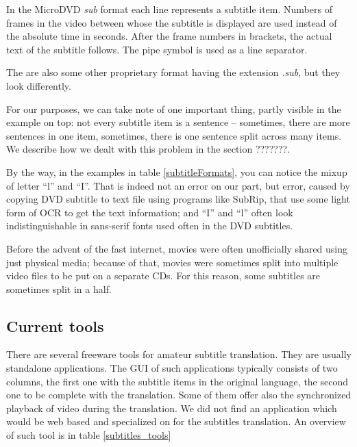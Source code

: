 In the MicroDVD \emph{sub} format each line represents a subtitle item. Numbers of frames in the video between whose the subtitle is displayed are used instead of the absolute time in seconds. After the frame numbers in brackets, the actual text of the subtitle follows. The pipe symbol is used as a line separator. 

The are also some other proprietary format having the extension \emph{.sub}, but they look differently.

For our purposes, we can take note of one important thing, partly visible in the example on top: not every subtitle item is a sentence -- sometimes, there are more sentences in one item, sometimes, there is one sentence split across many items. We describe how we dealt with this problem in the section ???????.

By the way, in the examples in table \ref{subtitleFormats}, you can notice the mixup of letter ``l'' and ``I''. That is indeed not an error on our part, but error, caused by copying DVD subtitle to text file using programs like SubRip, that use some light form of OCR to get the text information; and ``I'' and ``l'' often look indistinguishable in sans-serif fonts used often in the DVD subtitles.

Before the advent of the fast internet, movies were often unofficially shared using just physical media; because of that, movies were sometimes split into multiple video files to be put on a separate CDs. For this reason, some subtitles are sometimes split in a half.

\subsection{Current tools}

There are several freeware tools for amateur subtitle translation. They are usually standalone applications. The GUI of such applications typically consists of two columns, the first one with the subtitle items in the original language, the second one to be complete with the translation. Some of them offer also the synchronized playback of video during the translation. We did not find an application which would be web based and specialized on for the subtitles translation. An overview of such tool is in table \ref{subtitles_tools}

